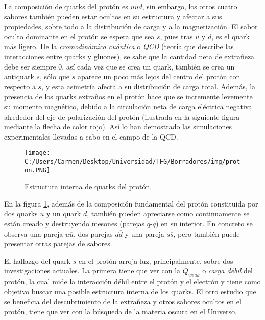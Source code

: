 La composición de quarks del protón es $uud$, sin embargo, los otros cuatro sabores también pueden estar ocultos en su estructura y afectar a sus propiedades, sobre todo a la distribución de carga y a la magnetización. El sabor oculto dominante en el protón se espera que sea $s$, pues tras $u$ y $d$, es el quark más ligero. De la \textit{cromodinámica cuántica} o \textit{QCD} (teoria que describe las interacciones entre quarks y gluones), se sabe que la cantidad neta de extrañeza debe ser siempre 0, así cada vez que se crea un quark, también se crea un antiquark $\overline{s}$, sólo que $\overline{s}$ aparece un poco más lejos del centro del protón con respecto a $s$, y esta asimetría afecta a su distribución de carga total. Además, la presencia de los quarks extraños en el protón hace que se incremente levemente su momento magnético, debido a la circulación neta de carga eléctrica negativa alrededor del eje de polarización del protón\cite{protonYoung} (ilustrada en la siguiente figura mediante la flecha de color rojo). Así lo han demostrado las simulaciones experimentales llevadas a cabo en el campo de la QCD.\\

\begin{figure}[h]
	\centering
	\texttt{[image: C:/Users/Carmen/Desktop/Universidad/TFG/Borradores/img/proton.PNG]}
	\caption[Estructura interna del protón]
	{Estructura interna de quarks del protón. \cite{protonYoung}}
	\label{fig:proton}
\end{figure}

En la figura \ref{fig:proton}, además de la composición fundamental del protón constituida por dos quarks $u$ y un quark $d$, también pueden apreciarse como continuamente se están creado y destruyendo mesones (parejas $q$-$\overline{q}$) en su interior. En concreto se observa una pareja $u\overline{u}$, dos parejas $d\overline{d}$ y una pareja $s\overline{s}$, pero también puede presentar otras parejas de sabores. 

El hallazgo del quark $s$ en el protón arroja luz, principalmente, sobre dos investigaciones actuales. La primera tiene que ver con la $Q_{weak}$ o \textit{carga débil} del protón, la cual mide la  interacción débil entre el protón y el electrón y tiene como objetivo buscar una posible estructura interna de los quarks. El otro estudio que se beneficia del descubrimiento de la extrañeza y otros sabores ocultos en el protón, tiene que ver con la búsqueda de la materia oscura en el Universo. 

